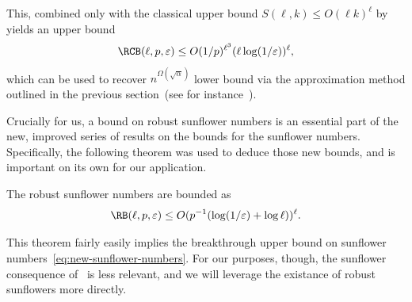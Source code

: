 This, combined only with the classical upper bound $S(\ell, k) \leq O(\ell k)^{\ell}$ by \ErdosRado yields an upper bound
\begin{equation*}
    \RCB(\ell, p, \varepsilon) \leq O(1/p)^{\ell^3} (\ell \log(1/\varepsilon))^\ell,
\end{equation*}
which can be used to recover $n^{\Omega(\sqrt{\alpha})}$ lower bound via the approximation method outlined in the previous section~(see for instance~).

Crucially for us, a bound on robust sunflower numbers is an essential part of the new, improved series of results on the bounds for the sunflower numbers. Specifically, the following theorem was used to deduce those new bounds, and is important on its own for our application.

\begin{theorem}
\label{thm:robust-sunflowers}
    The robust sunflower numbers are bounded as
    \begin{equation*}
        \RB(\ell, p, \varepsilon) \leq O(p^{-1} (\log(1/\varepsilon) + \log \ell) )^{\ell}.
    \end{equation*}
\end{theorem}
This theorem fairly easily implies the breakthrough upper bound on sunflower numbers~\eqref{eq:new-sunflower-numbers}. For our purposes, though, the sunflower consequence of~ is less relevant, and we will leverage the existance of robust sunflowers more directly.

